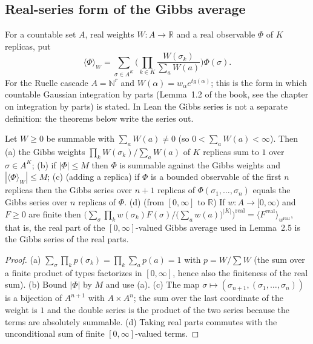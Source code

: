 \subsection*{Real-series form of the Gibbs average}

\begin{definition}\label{def:sg:gibbs-series}
  \leanok
For a countable set $A$, real weights $W:A\to\mathbb R$ and a real observable $\Phi$ of $K$ replicas, put
\[
 \langle\Phi\rangle_W=\sum_{\sigma\in A^K}\Big(\prod_{k\in K}\frac{W(\sigma_k)}{\sum_{a}W(a)}\Big)\Phi(\sigma).
\]
For the Ruelle cascade $A=\mathbb N^r$ and $W(\alpha)=w_\alpha e^{tg(\alpha)}$; this is the form in which countable Gaussian integration by parts
(Lemma~1.2 of the book, see the chapter on integration by parts) is stated. In Lean the Gibbs series is not a separate definition: the theorems below write the series out.
\end{definition}

\begin{theorem}\label{thm:sg:gibbs-series}
  \leanok
Let $W\ge0$ be summable with $\sum_aW(a)\ne0$ (so $0<\sum_aW(a)<\infty$). Then
(a) the Gibbs weights $\prod_kW(\sigma_k)/\sum_aW(a)$ of $K$ replicas sum to $1$ over $\sigma\in A^K$;
(b) if $|\Phi|\le M$ then $\Phi$ is summable against the Gibbs weights and $|\langle\Phi\rangle_W|\le M$;
(c) (adding a replica) if $\Phi$ is a bounded observable of the first $n$ replicas then the Gibbs series over $n+1$ replicas of $\Phi(\sigma_1,\dots,\sigma_n)$ equals the
Gibbs series over $n$ replicas of $\Phi$.
(d) (from $[0,\infty]$ to $\mathbb R$) If $w:A\to[0,\infty)$ and $F\ge0$ are finite then
$\Big(\sum_\sigma\prod_kw(\sigma_k)F(\sigma)\Big/\big(\sum_aw(a)\big)^{|K|}\Big)^{\mathrm{real}}=\langle F^{\mathrm{real}}\rangle_{w^{\mathrm{real}}}$,
that is, the real part of the $[0,\infty]$-valued Gibbs average used in Lemma~2.5 is the Gibbs series of the real parts.
\end{theorem}
\begin{proof}
  \leanok
(a) $\sum_\sigma\prod_k p(\sigma_k)=\prod_k\sum_ap(a)=1$ with $p=W/\sum W$ (the sum over a finite product of types factorizes in $[0,\infty]$, hence also the finiteness of the
real sum). (b) Bound $|\Phi|$ by $M$ and use (a). (c) The map $\sigma\mapsto(\sigma_{n+1},(\sigma_1,\dots,\sigma_n))$ is a bijection of $A^{n+1}$ with $A\times A^n$; the sum over the last coordinate of the
weight is $1$ and the double series is the product of the two series because the terms are absolutely summable. (d) Taking real parts commutes with the unconditional sum of finite
$[0,\infty]$-valued terms.
\end{proof}

